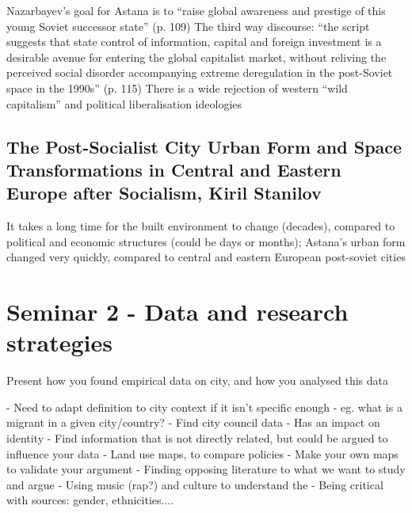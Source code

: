 \documentclass{article}
\begin{document}
\begin{outline}
	\1 Nazarbayev's goal for Astana is to ``raise global awareness and prestige of this young Soviet successor state'' (p. 109)
	\1 The third way discourse: ``the script suggests that state control of information, capital and foreign investment is a desirable avenue for entering the global capitalist market, without reliving the perceived social disorder accompanying extreme deregulation in the post-Soviet space in the 1990s'' (p. 115)
	\2 There is a wide rejection of western ``wild capitalism'' and political liberalisation ideologies
\end{outline}

\subsection{The Post-Socialist City Urban Form and Space Transformations in Central and Eastern Europe after Socialism, Kiril Stanilov}

\begin{outline}
	\1 It takes a long time for the built environment to change (decades), compared to political and economic structures (could be days or months); Astana's urban form changed very quickly, compared to central and eastern European post-soviet cities
\end{outline}


\section{Seminar 2 - Data and research strategies}

\begin{outline}
	\1 Present how you found empirical data on city, and how you analysed this data
\end{outline}

- Need to adapt definition to city context if it isn't specific enough - eg. what is a migrant in a given city/country?
- Find city council data
- Has an impact on identity
- Find information that is not directly related, but could be argued to influence your data
- Land use maps, to compare policies
- Make your own maps to validate your argument
- Finding opposing literature to what we want to study and argue 
- Using music (rap?) and culture to understand the 
- Being critical with sources: gender, ethnicities.... 
\end{document}
